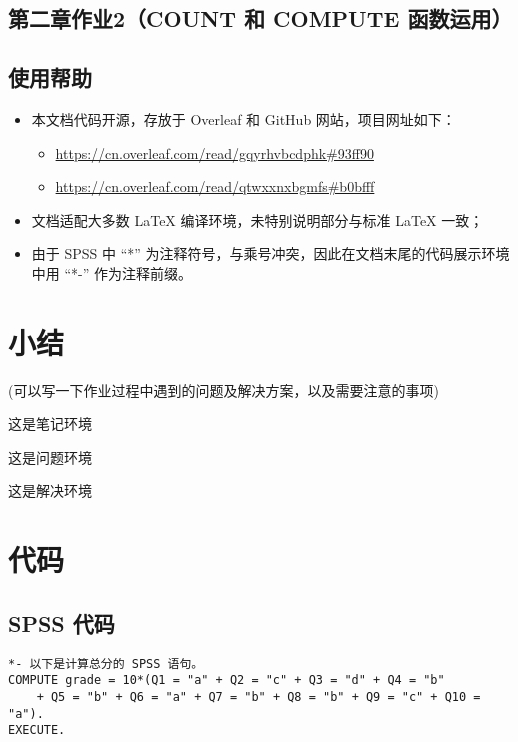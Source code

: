 \documentclass[12pt]{HomeWork}
\begin{document}
\subsection{第二章作业2（COUNT 和 COMPUTE 函数运用）}

\subsection{使用帮助}
\begin{itemize}
    \item 本文档代码开源，存放于 Overleaf 和 GitHub 网站，项目网址如下：
    \begin{itemize}
        \item \href{https://cn.overleaf.com/read/gqyrhvbcdphk\#93ff90}{\url{https://cn.overleaf.com/read/gqyrhvbcdphk\#93ff90}}
        \item \href{https://cn.overleaf.com/read/qtwxxnxbgmfs\#b0bfff}{\url{https://cn.overleaf.com/read/qtwxxnxbgmfs\#b0bfff}}
    \end{itemize}
    \item 文档适配大多数 LaTeX 编译环境，未特别说明部分与标准 LaTeX 一致；
    \item 由于 SPSS 中 ``*'' 为注释符号，与乘号冲突，因此在文档末尾的代码展示环境中用 ``*-'' 作为注释前缀。
\end{itemize}

\section*{小结}
(可以写一下作业过程中遇到的问题及解决方案，以及需要注意的事项)

\begin{note}
    这是笔记环境
\end{note}

\begin{prb}
    这是问题环境
\end{prb}

\begin{soln}
    这是解决环境
\end{soln}

\section{代码}
\subsection{SPSS 代码}
\begin{lstlisting}[language=SPSS, caption={SPSS 计算示例}]
*- 以下是计算总分的 SPSS 语句。
COMPUTE grade = 10*(Q1 = "a" + Q2 = "c" + Q3 = "d" + Q4 = "b" 
    + Q5 = "b" + Q6 = "a" + Q7 = "b" + Q8 = "b" + Q9 = "c" + Q10 = "a").
EXECUTE.
\end{lstlisting}
\end{document}
